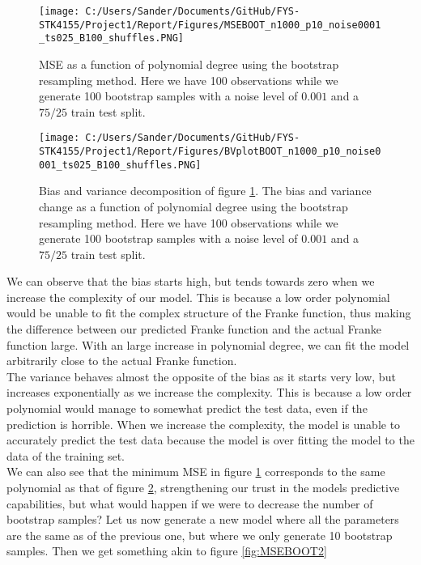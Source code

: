 \documentclass[12pt,a4paper]{article}
\begin{document}
\begin{figure}[H]
\centering
\texttt{[image: C:/Users/Sander/Documents/GitHub/FYS-STK4155/Project1/Report/Figures/MSEBOOT\_n1000\_p10\_noise0001\_ts025\_B100\_shuffles.PNG]}
\caption{\label{fig:MSEBOOT1} MSE as a function of polynomial degree using the bootstrap resampling method. Here we have 100 observations while we generate 100 bootstrap samples with a noise level of $0.001$ and a $75/25$ train test split.}
\end{figure}

\begin{figure}[H]
\centering
\texttt{[image: C:/Users/Sander/Documents/GitHub/FYS-STK4155/Project1/Report/Figures/BVplotBOOT\_n1000\_p10\_noise0001\_ts025\_B100\_shuffles.PNG]}
\caption{\label{fig:BVBOOT1} Bias and variance decomposition of figure \ref{fig:MSEBOOT1}. The bias and variance change as a function of polynomial degree using the bootstrap resampling method. Here we have 100 observations while we generate 100 bootstrap samples with a noise level of $0.001$ and a $75/25$ train test split.}
\end{figure}

\noindent We can observe that the bias starts high, but tends towards zero when we increase the complexity of our model. This is because a low order polynomial would be unable to fit the complex structure of the Franke function, thus making the difference between our predicted Franke function and the actual Franke function large. With an large increase in polynomial degree, we can fit the model arbitrarily close to the actual Franke function. 
\\
The variance behaves almost the opposite of the bias as it starts very low, but increases exponentially as we increase the complexity. This is because a low order polynomial would manage to somewhat predict the test data, even if the prediction is horrible. When we increase the complexity, the model is unable to accurately predict the test data because the model is over fitting the model to the data of the training set. 
\\
We can also see that the minimum MSE in figure \ref{fig:MSEBOOT1} corresponds to the same polynomial as that of figure \ref{fig:BVBOOT1}, strengthening our trust in the models predictive capabilities, but what would happen if we were to decrease the number of bootstrap samples? Let us now generate a new model where all the parameters are the same as of the previous one, but where we only generate 10 bootstrap samples. Then we get something akin to figure \ref{fig:MSEBOOT2}
\end{document}
